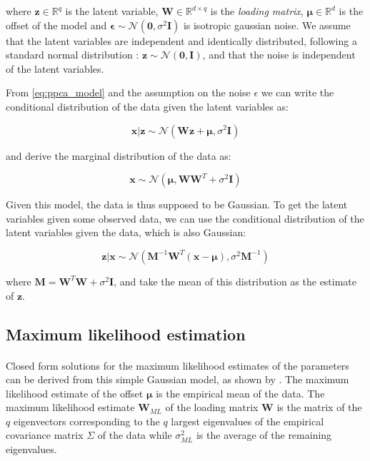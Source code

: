 \documentclass{article}
\newcommand{\R}{\mathbb{R}}
\begin{document}
    where $\mathbf{z} \in \R^q$ is the latent variable, $\mathbf{W} \in \R^{d \times q}$ is the \emph{loading matrix}, $\boldsymbol{\mu} \in \R^d$ is the offset of the model and $\boldsymbol{\epsilon} \sim \mathcal{N}(\mathbf{0}, \sigma^2\mathbf{I})$ is isotropic gaussian noise. We assume that the latent variables are independent and identically distributed, following a standard normal distribution : $\mathbf{z} \sim \mathcal{N}(\mathbf{0}, \mathbf{I})$, and that the noise is independent of the latent variables.

From \ref{eq:ppca_model} and the assumption on the noise $\epsilon$ we can write the conditional distribution of the data given the latent variables as:

\begin{equation}
    \label{eq:ppca_conditional}
    \mathbf{x} | \mathbf{z} \sim \mathcal{N}(\mathbf{Wz} + \boldsymbol{\mu}, \sigma^2\mathbf{I})
\end{equation}

and derive the marginal distribution of the data as:

\begin{equation}
    \label{eq:ppca_marginal}
    \mathbf{x} \sim \mathcal{N}(\boldsymbol{\mu}, \mathbf{WW}^T + \sigma^2\mathbf{I})
\end{equation}

Given this model, the data is thus supposed to be Gaussian. To get the latent variables given some observed data, we can use the conditional distribution of the latent variables given the data, which is also Gaussian:

\begin{equation}
    \label{eq:ppca_z_given_x}
    \mathbf{z} | \mathbf{x} \sim \mathcal{N}(\mathbf{M}^{-1}\mathbf{W}^T(\mathbf{x} - \boldsymbol{\mu}), \sigma^2\mathbf{M}^{-1})
\end{equation}

where $\mathbf{M} = \mathbf{W}^T\mathbf{W} + \sigma^2\mathbf{I}$, and take the mean of this distribution as the estimate of $\mathbf{z}$.

\subsection{Maximum likelihood estimation}

\paragraph{} Closed form solutions for the maximum likelihood estimates of the parameters can be derived from this simple Gaussian model, as shown by \citet{PPCA}. The maximum likelihood estimate of the offset $\boldsymbol{\mu}$ is the empirical mean of the data. The maximum likelihood estimate $\mathbf{W}_{ML}$ of the loading matrix $\mathbf{W}$ is the matrix of the $q$ eigenvectors corresponding to the $q$ largest eigenvalues of the empirical covariance matrix $\Sigma$ of the data while $\sigma^2_{ML}$ is the average of the remaining eigenvalues.
\end{document}
